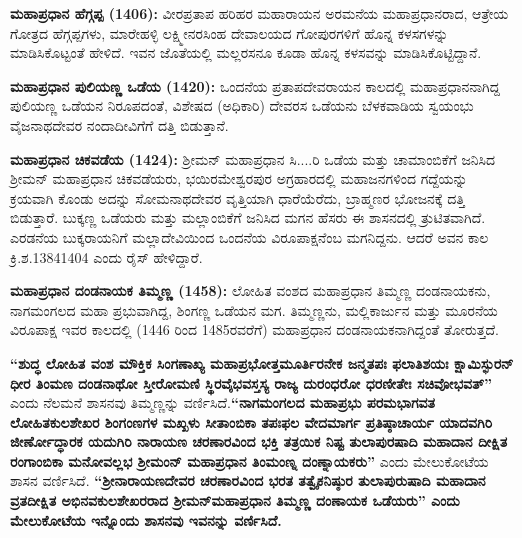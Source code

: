\textbf{ಮಹಾಪ್ರಧಾನ ಹೆಗ್ಗಪ್ಪ (1406):} ವೀರಪ್ರತಾಪ ಹರಿಹರ ಮಹಾರಾಯನ ಅರಮನೆಯ ಮಹಾಪ್ರಧಾನರಾದ, ಆತ್ರೇಯ ಗೋತ್ರದ ಹೆಗ್ಗಪ್ಪಗಳು, ಮಾರೇಹಳ್ಳಿ ಲಕ್ಷ್ಮೀನರಸಿಂಹ ದೇವಾಲಯದ ಗೋಪುರಗಳಿಗೆ ಹೊನ್ನ ಕಳಸಗಳನ್ನು ಮಾಡಿಸಿಕೊಟ್ಟಂತೆ ಹೇಳಿದೆ. ಇವನ ಜೊತೆಯಲ್ಲಿ ಮಲ್ಲರಸನೂ ಕೂಡಾ ಹೊನ್ನ ಕಳಸವನ್ನು ಮಾಡಿಸಿಕೊಟ್ಟಿದ್ದಾನೆ.

\textbf{ಮಹಾಪ್ರಧಾನ ಪುಲಿಯಣ್ಣ ಒಡೆಯ (1420):} ಒಂದನೆಯ ಪ್ರತಾಪದೇವರಾಯನ ಕಾಲದಲ್ಲಿ ಮಹಾಪ್ರಧಾನ\-ನಾಗಿದ್ದ ಪುಲಿಯಣ್ಣ ಒಡೆಯನ ನಿರೂಪದಂತೆ, ವಿಶೇಷದ (ಅಧಿಕಾರಿ) ದೇವರಸ ಒಡೆಯನು ಬೆಳಕವಾಡಿಯ ಸ್ವಯಂಭು ವೈಜನಾಥದೇವರ ನಂದಾದೀವಿಗೆಗೆ ದತ್ತಿ ಬಿಡುತ್ತಾನೆ.

\textbf{ಮಹಾಪ್ರಧಾನ ಚಿಕವಡೆಯ (1424):} ಶ‍್ರೀಮನ್​ ಮಹಾಪ್ರಧಾನ ಸಿ....ರಿ ಒಡೆಯ ಮತ್ತು ಚಾಮಾಂಬಿಕೆಗೆ ಜನಿಸಿದ ಶ‍್ರೀಮನ್​ ಮಹಾಪ್ರಧಾನ ಚಿಕವಡೆಯರು, ಭಯಿರಮೇಶ್ವರಪುರ ಅಗ್ರಹಾರದಲ್ಲಿ ಮಹಾಜನಗಳಿಂದ ಗದ್ದೆಯನ್ನು ಕ್ರಯವಾಗಿ ಕೊಂಡು ಅದನ್ನು ಸೋಮನಾಥದೇವರ ವೃತ್ತಿಯಾಗಿ ಧಾರೆಯೆರೆದು, ಬ್ರಾಹ್ಮಣರ ಭೋಜನಕ್ಕೆ ದತ್ತಿ ಬಿಡುತ್ತಾರೆ. ಬುಕ್ಕಣ್ಣ ಒಡೆಯರು ಮತ್ತು ಮಲ್ಲಾಂಬಿಕೆಗೆ ಜನಿಸಿದ ಮಗನ ಹೆಸರು ಈ ಶಾಸನದಲ್ಲಿ ತ್ರುಟಿತವಾಗಿದೆ. ಎರಡನೆಯ ಬುಕ್ಕರಾಯನಿಗೆ ಮಲ್ಲಾದೇವಿಯಿಂದ ಒಂದನೆಯ ವಿರೂಪಾಕ್ಷನೆಂಬ ಮಗನಿದ್ದನು. ಆದರೆ ಅವನ ಕಾಲ ಕ್ರಿ.ಶ.1384\enginline{-}1404 ಎಂದು ರೈಸ್​ ಹೇಳಿದ್ದಾರೆ.

\textbf{ಮಹಾಪ್ರಧಾನ ದಂಡನಾಯಕ ತಿಮ್ಮಣ್ಣ (1458):} ಲೋಹಿತ ವಂಶದ ಮಹಾಪ್ರಧಾನ ತಿಮ್ಮಣ್ಣ ದಂಡನಾಯಕನು, ನಾಗಮಂಗಲದ ಮಹಾ ಪ್ರಭುವಾಗಿದ್ದ, ಶಿಂಗಣ್ಣ ಒಡೆಯನ ಮಗ. ತಿಮ್ಮಣ್ಣನು, ಮಲ್ಲಿಕಾರ್ಜುನ ಮತ್ತು ಮೂರನೆಯ ವಿರೂಪಾಕ್ಷ ಇವರ ಕಾಲದಲ್ಲಿ (1446 ರಿಂದ 1485ರವರೆಗೆ) ಮಹಾಪ್ರಧಾನ ದಂಡನಾಯಕನಾಗಿದ್ದಂತೆ ತೋರುತ್ತದೆ.

\textbf{“ಶುದ್ಧ ಲೋಹಿತ ವಂಶ ಮೌಕ್ತಿಕ ಸಿಂಗಣಾಖ್ಯ ಮಹಾಪ್ರಭೋತ್ತಮೂರ್ತಿರನೇಕ ಜನ್ಮತಪಃ ಫಲಾತಿಶಯಃ ಕ್ಷಾಮಿಸ್ಫುರನ್​ ಧೀರ ತಿಂಮಣ ದಂಡನಾಥೋ ಸ್ತೀರೋಮಣಿ ಸ್ಥಿರವೈಭವಸ್ತಸ್ಯ ರಾಜ್ಯ ದುರಂಧರೋ ಧರಣೀತೇಃ ಸಚಿವೋಭವತ್​”} ಎಂದು ನೆಲಮನೆ ಶಾಸನವು ತಿಮ್ಮಣ್ಣನ್ನು ವರ್ಣಿಸಿದೆ.\textbf{“ನಾಗಮಂಗಲದ ಮಹಾಪ್ರಭು ಪರಮಭಾಗವತ ಲೋಹಿತಕುಲಶೇಖರ ಶಿಂಗಂಣಗಳ ಮಖ್ಖಳು ಸೀತಾಂಬಿಕಾ ತಪಃಫಲ ವೇದಮಾರ್ಗ ಪ್ರತಿಷ್ಠಾಚಾರ್ಯ ಯಾದವಗಿರಿ ಜೀರ್ಣೋದ್ಧಾರಕ ಯದುಗಿರಿ ನಾರಾಯಣ ಚರಣಾರವಿಂದ ಭಕ್ತಿ ತತ್ರಯಿಕ ನಿಷ್ಟ ತುಲಾಪುರಷಾದಿ ಮಹಾದಾನ ದೀಕ್ಷಿತ ರಂಗಾಂಬಿಕಾ ಮನೋವಲ್ಲಭ ಶ‍್ರೀಮಂನ್​ ಮಹಾಪ್ರಧಾನ ತಿಂಮಂಣ್ನ ದಂಣ್ನಾಯಕರು”} ಎಂದು ಮೇಲುಕೋಟೆಯ ಶಾಸನ ವರ್ಣಿಸಿದೆ.\textbf{ “ಶ‍್ರೀನಾರಾಯಣ\-ದೇವರ ಚರಣಾರವಿಂದ ಭರತ ತತ್ವೈಕನಿಷ್ಠುರ ತುಲಾಪುರುಷಾದಿ ಮಹಾದಾನ ವ್ರತದೀಕ್ಷಿತ ಅಭಿನವಕುಲಶೇಖರರಾದ ಶ‍್ರೀಮನ್​ ಮಹಾಪ್ರಧಾನ ತಿಮ್ಮಣ್ಣ ದಂಣಾಯಕ ಒಡೆಯರು” ಎಂದು ಮೇಲುಕೋಟೆಯ ಇನ್ನೊಂದು ಶಾಸನವು ಇವನನ್ನು ವರ್ಣಿಸಿದೆ.}

